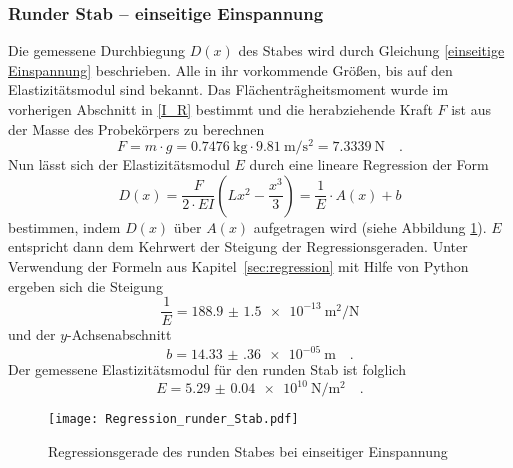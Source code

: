 \subsubsection{Runder Stab -- einseitige Einspannung}
Die gemessene Durchbiegung $D(x)$ des Stabes wird durch Gleichung \eqref{einseitige Einspannung} beschrieben.
Alle in ihr vorkommende Größen, bis auf den Elastizitätsmodul sind bekannt. Das Flächenträgheitsmoment wurde im vorherigen Abschnitt in \eqref{I_R} bestimmt und die herabziehende Kraft $F$ ist aus der Masse des Probekörpers zu berechnen
\begin{equation}
  F = m \cdot g = \SI{0.7476}{\kilo\gram} \cdot \SI{9.81}{\metre\per\second\squared} = \SI{7.3339}{\newton} \quad .
\end{equation}
Nun lässt sich der Elastizitätsmodul $E$ durch eine lineare Regression der Form
\begin{equation}
  D(x) = \frac{F}{2\cdot E I}\left(Lx^2-\frac{x^3}{3}\right) = \frac{1}{E} \cdot A(x) +b
\end{equation}
bestimmen, indem $D(x)$ über $A(x)$ aufgetragen wird (siehe Abbildung \ref{fig:Regression_runder_Stab}). $E$ entspricht dann dem Kehrwert der Steigung der Regressionsgeraden. Unter Verwendung der Formeln aus Kapitel~\ref{sec:regression} mit Hilfe von Python ergeben sich die Steigung
\begin{equation}
  \frac{1}{E}= \SI{188.9(15)e-13}{\metre\squared\per\newton}
\end{equation}
und der $y$-Achsenabschnitt
\begin{equation}
  b = \SI{14.33(36)e-05}{\metre} \quad.
\end{equation}
Der gemessene Elastizitätsmodul für den runden Stab ist folglich
\begin{equation}
  E = \SI{5.29(4)e+10}{\newton\per\metre\squared} \quad.
\end{equation}

\begin{figure}
\centering
\texttt{[image: Regression\_runder\_Stab.pdf]}
\caption{Regressionsgerade des runden Stabes bei einseitiger Einspannung}
\label{fig:Regression_runder_Stab}
\end{figure}



